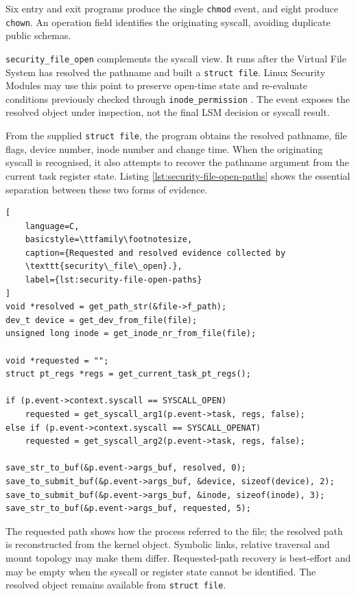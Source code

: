 Six entry and exit programs produce the single \texttt{chmod} event, and eight
produce \texttt{chown}. An operation field identifies the originating syscall,
avoiding duplicate public schemas.

\texttt{security\_file\_open} complements the syscall view. It runs after the
Virtual File System has resolved the pathname and built a \texttt{struct file}.
Linux Security Modules may use this point to preserve open-time state and
re-evaluate conditions previously checked through \texttt{inode\_permission}
\cite{linuxKernelSecurityFileOpen}. The event exposes the resolved object under
inspection, not the final LSM decision or syscall result.

From the supplied \texttt{struct file}, the program obtains the resolved
pathname, file flags, device number, inode number and change time. When the
originating syscall is recognised, it also attempts to recover the pathname
argument from the current task register state. Listing
\ref{lst:security-file-open-paths} shows the essential separation between these
two forms of evidence.

\begin{lstlisting}[
    language=C,
    basicstyle=\ttfamily\footnotesize,
    caption={Requested and resolved evidence collected by
    \texttt{security\_file\_open}.},
    label={lst:security-file-open-paths}
]
void *resolved = get_path_str(&file->f_path);
dev_t device = get_dev_from_file(file);
unsigned long inode = get_inode_nr_from_file(file);

void *requested = "";
struct pt_regs *regs = get_current_task_pt_regs();

if (p.event->context.syscall == SYSCALL_OPEN)
    requested = get_syscall_arg1(p.event->task, regs, false);
else if (p.event->context.syscall == SYSCALL_OPENAT)
    requested = get_syscall_arg2(p.event->task, regs, false);

save_str_to_buf(&p.event->args_buf, resolved, 0);
save_to_submit_buf(&p.event->args_buf, &device, sizeof(device), 2);
save_to_submit_buf(&p.event->args_buf, &inode, sizeof(inode), 3);
save_str_to_buf(&p.event->args_buf, requested, 5);
\end{lstlisting}

The requested path shows how the process referred to the file; the resolved
path is reconstructed from the kernel object. Symbolic links, relative
traversal and mount topology may make them differ. Requested-path recovery is
best-effort and may be empty when the syscall or register state cannot be
identified. The resolved object remains available from \texttt{struct file}.

